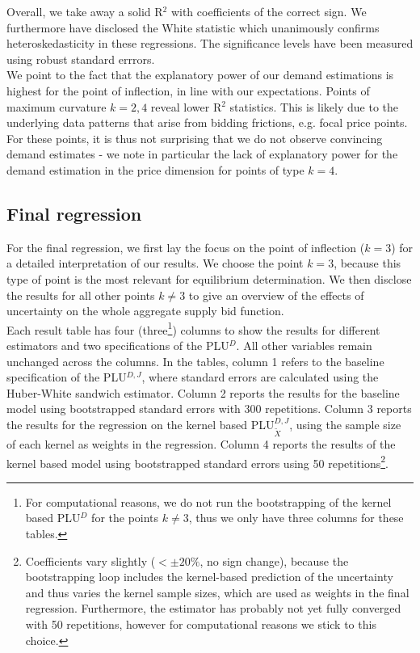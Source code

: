 Overall, we take away a solid R$^2$ with coefficients of the correct sign. We furthermore have disclosed the White statistic which unanimously confirms heteroskedasticity in these regressions. The significance levels have been measured using robust standard errrors. \\

We point to the fact that the explanatory power of our demand estimations is highest for the point of inflection, in line with our expectations. 
Points of maximum curvature $k=2,4$ reveal lower R$^2$ statistics. This is likely due to the underlying data patterns that arise from bidding frictions, e.g. focal price points. For these points, it is thus not surprising that we do not observe convincing demand estimates - we note in particular the lack of explanatory power for the demand estimation in the price dimension for points of type $k=4$. \\



\subsection{Final regression}
\label{discident}
For the final regression, we first lay the focus on the point of inflection ($k=3$) for a detailed interpretation of our results. We choose the point $k=3$, because this type of point is the most relevant for equilibrium determination.
We then disclose the results for all other points $k \neq 3$ to give an overview of the effects of uncertainty on the whole aggregate supply bid function. \\

Each result table has four (three\footnote{For computational reasons, we do not run the bootstrapping of the kernel based PLU$^D$ for the points $k\neq 3$, thus we only have three columns for these tables.}) columns to show the results for different estimators and two specifications of the PLU$^D$. All other variables remain unchanged across the columns. In the tables, column 1 refers to the baseline specification of the PLU$^{D,J}$, where standard errors are calculated using the Huber-White sandwich estimator. Column 2 reports the results for the baseline model using bootstrapped standard errors with 300 repetitions. Column 3 reports the results for the regression on the kernel based PLU$^{D,J}_{\tilde{X}}$, using the sample size of each kernel as weights in the regression. Column 4 reports the results of the kernel based model using bootstrapped standard errors using 50 repetitions\footnote{Coefficients vary slightly ($<\pm20\%$, no sign change), because the bootstrapping loop includes the kernel-based prediction of the uncertainty and thus varies the kernel sample sizes, which are used as weights in the final regression. Furthermore, the estimator has probably not yet fully converged with 50 repetitions, however for computational reasons we stick to this choice.}. \\


